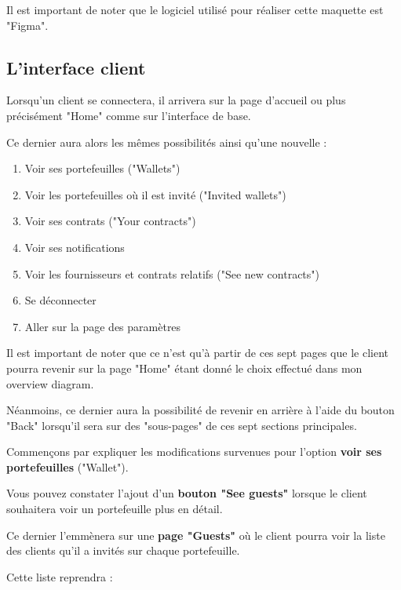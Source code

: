 \begin{flushleft}
Il est important de noter que le logiciel utilisé pour réaliser cette maquette est "Figma".
\end{flushleft}
\newpage

\subsection{L'interface client}

Lorsqu'un client se connectera, il arrivera sur la page d'accueil ou plus précisément "Home" comme sur l'interface de base.
\begin{flushleft}
Ce dernier aura alors les mêmes possibilités ainsi qu'une nouvelle :
\end{flushleft}
\begin{enumerate}
\item Voir ses portefeuilles ("Wallets")
\item Voir les portefeuilles où il est invité ("Invited wallets")
\item Voir ses contrats ("Your contracts")
\item Voir ses notifications
\item Voir les fournisseurs et contrats relatifs ("See new contracts")
\item Se déconnecter
\item Aller sur la page des paramètres
\end{enumerate}

\begin{flushleft}
Il est important de noter que ce n'est qu'à partir de ces sept pages que le client pourra revenir sur la page "Home" étant donné le choix effectué dans mon overview diagram.
\end{flushleft}

\begin{flushleft}
Néanmoins, ce dernier aura la possibilité de revenir en arrière à l'aide du bouton "Back" lorsqu'il sera sur des "sous-pages" de ces sept sections principales.
\end{flushleft}

\newpage

\begin{flushleft}
Commençons par expliquer les modifications survenues pour l'option \textbf{voir ses portefeuilles} ("Wallet").
\end{flushleft}
\begin{flushleft}
Vous pouvez constater l'ajout d'un \textbf{bouton "See guests"} lorsque le client souhaitera voir un portefeuille plus en détail.
\end{flushleft}
\begin{flushleft}
Ce dernier l'emmènera sur une \textbf{page "Guests"} où le client pourra voir la liste des clients qu'il a invités sur chaque portefeuille.
\end{flushleft}
\begin{flushleft}
Cette liste reprendra :
\end{flushleft}


